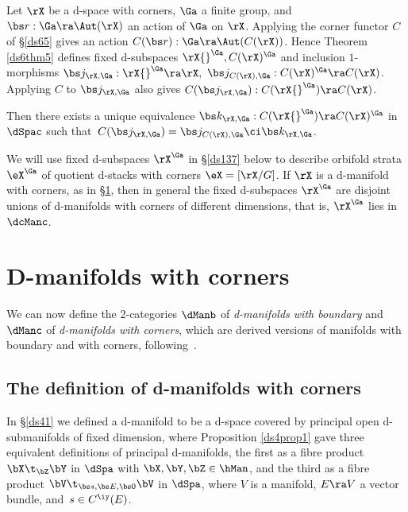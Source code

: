 \documentclass{article}
\begin{document}
\begin{prop} Let\/ $\rX$ be a d-space with corners, $\Ga$ a finite
group, and\/ $\bs r:\Ga\ra\Aut(\rX)$ an action of\/ $\Ga$ on\/
$\rX$. Applying the corner functor $C$ of\/ {\rm\S\ref{ds65}} gives
an action $C(\bs r):\Ga\ra\Aut(C(\rX))$. Hence Theorem\/
{\rm\ref{ds6thm5}} defines fixed d-subspaces $\rX{}^\Ga,C(\rX)^\Ga$
and inclusion $1$-morphisms $\bs j_{\rX,\Ga}:\rX{}^\Ga\ra\rX,$ $\bs
j_{C(\rX),\Ga}:C(\rX)^\Ga\ra C(\rX)$. Applying $C$ to $\bs
j_{\rX,\Ga}$ also gives $C(\bs j_{\rX,\Ga}):C(\rX{}^\Ga)\ra C(\rX)$.

Then there exists a unique equivalence $\bs
k_{\rX,\Ga}:C(\rX{}^\Ga)\ra C(\rX)^\Ga$ in $\dSpac$ such
that\/~$C(\bs j_{\rX,\Ga})=\bs j_{C(\rX),\Ga}\ci\bs k_{\rX,\Ga}$.
\label{ds6prop3}
\end{prop}

We will use fixed d-subspaces $\rX^\Ga$ in \S\ref{ds137} below to
describe orbifold strata $\eX^\Ga$ of quotient d-stacks with
corners $\eX=[\rX/G]$.
If $\rX$ is a d-manifold with corners, as in \S\ref{ds7}, then in
general the fixed d-subspaces $\rX^\Ga$ are disjoint unions of
d-manifolds with corners of different dimensions, that is, $\rX^\Ga$
lies in~$\dcManc$.

\section{D-manifolds with corners}
\label{ds7}

We can now define the 2-categories $\dManb$ of {\it d-manifolds with
boundary\/} and $\dManc$ of {\it d-manifolds with corners}, which
are derived versions of manifolds with boundary and with corners,
following~\cite[Chap.~7]{Joyc6}.

\subsection{The definition of d-manifolds with corners}
\label{ds71}

In \S\ref{ds41} we defined a d-manifold to be a d-space covered by
principal open d-submanifolds of fixed dimension, where Proposition
\ref{ds4prop1} gave three equivalent definitions of principal
d-manifolds, the first as a fibre product
$\bX\t_\bZ\bY$ in $\dSpa$ with $\bX,\bY,\bZ\in\hMan$, and the third
as a fibre product $\bV\t_{\bs s,\bs E,\bs 0}\bV$ in $\dSpa$, where
$V$ is a manifold, $E\ra V$ a vector bundle, and~$s\in C^\iy(E)$.
\end{document}
